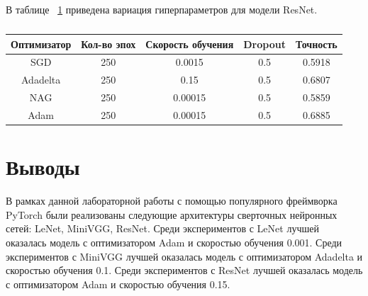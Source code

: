 \documentclass[a4paper, 14pt]{extarticle}
\begin{document}
В таблице ~\ref{tab3:ResNet} приведена вариация гиперпараметров для модели ResNet.

\begin{table}[h]
\centering
\caption{}
\label{tab3:ResNet}
\begin{tabular}{|c|c|c|c|c|}
  \hline
  Оптимизатор & Кол-во эпох  & Скорость обучения & Dropout & Точность \\
  \hline
  SGD & 250 & 0.0015 & 0.5 & 0.5918 \\
  \hline
  Adadelta & 250 & 0.15 & 0.5 & 0.6807 \\
  \hline
  NAG & 250 & 0.00015 & 0.5 & 0.5859 \\
  \hline
  Adam & 250 & 0.00015 & 0.5 & 0.6885 \\
  \hline
\end{tabular}
\end{table}



\section{Выводы}
В рамках данной лабораторной работы с помощью популярного фреймворка PyTorch были реализованы следующие архитектуры сверточных нейронных сетей: LeNet, MiniVGG, ResNet. Среди экспериментов с LeNet лучшей оказалась модель с оптимизатором Adam и скоростью обучения 0.001. Среди экспериментов с MiniVGG лучшей оказалась модель с оптимизатором Adadelta и скоростью обучения 0.1. Среди экспериментов с ResNet лучшей оказалась модель с оптимизатором Adam и скоростью обучения 0.15.
\end{document}
